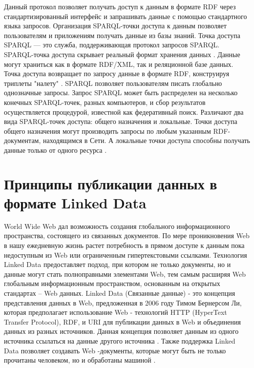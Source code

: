Данный протокол позволяет получать доступ к данным в формате RDF через стандартизированный интерфейс и запрашивать данные с помощью стандартного языка запросов. Организация SPARQL-точки доступа к данным позволяет пользователям и приложениям получать данные из базы знаний. Точка доступа SPARQL — это служба, поддерживающая протокол запросов SPARQL. SPARQL-точка доступа скрывает реальный формат хранения данных \cite{perez2009semantics}. Данные могут храниться как в формате RDF/XML, так и реляционной базе данных. Точка доступа возвращает по запросу данные в формате RDF, конструируя триплеты "налету" \cite{quilitz2008querying}. SPARQL позволяет пользователям писать глобально однозначные запросы. Запрос SPARQL может быть распределен на несколько конечных SPARQL-точек, разных компьютеров, и сбор результатов осуществляется процедурой, известной как федеративный поиск. Различают два вида SPARQL-точек доступа: общего назначения и локальные. Точки доступа общего назначения могут производить запросы по любым указанным RDF-документам, находящимся в Сети. А локальные точки доступа способны получать данные только от одного ресурса \cite{hartig2009executing}.



\section{Принципы публикации данных в формате Linked Data} \label{sect1_5}

World Wide Web дал возможность создания глобального информационного пространства, состоящего из связанных документов. По мере проникновения Web в нашу ежедневную жизнь растет потребность в прямом доступе к данным пока недоступным из Web или ограниченным гипертекстовыми ссылками. Технология Linked Data предоставляет подход, при котором не только документы, но и данные могут стать полноправными элементами Web, тем самым
расширяя Web глобальным информационным пространством, основанным на открытых стандартах – Web данных. Linked Data (Связанные данные) - это концепция представления данных в Web, предложенная в 2006 году Тимом Бернерсом Ли, которая предполагает использование Web - технологий HTTP (HyperText Transfer Protocol), RDF, и URI для публикации данных в Web и объединения данных из разных источников. Данная концепция позволяет данным из одного источника ссылаться на данные другого источника \cite{heath2011linked}. Также поддержка Linked Data позволяет создавать Web -документы, которые могут быть не только прочитаны человеком, но и обработаны машиной \cite{bizer2009linked}. 

